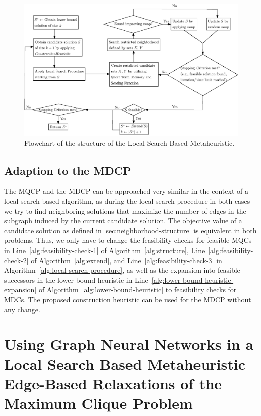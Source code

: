 \documentclass[draft,final]{vutinfth} %
\begin{document}
\begin{figure}
    \centering
    \includegraphics[width=\textwidth]{graphics/flowchart_local_search_algorithm.eps}
    \caption{Flowchart of the structure of the Local Search Based Metaheuristic.}
    \label{fig:flowchart-local-search-algorithm}
\end{figure}
 
\section{Adaption to the MDCP}\label{sec:adaption-to-mdcp}
The MQCP and the MDCP can be approached very similar in the context of a local search based algorithm, as during the local search procedure in both cases we try to find neighboring solutions that maximize the number of edges in the subgraph induced by the current candidate solution. The objective value of a candidate solution as defined in \ref{sec:neighborhood-structure} is equivalent in both problems. Thus, we only have to change the feasibility checks for feasible MQCs in Line~\ref{alg:feasibility-check-1} of Algorithm~\ref{alg:structure}, Line~\ref{alg:feasibility-check-2} of Algorithm~\ref{alg:extend}, and Line~\ref{alg:feasibility-check-3} in Algorithm~\ref{alg:local-search-procedure}, as well as the expansion into feasible successors in the lower bound heuristic in Line~\ref{alg:lower-bound-heuristic-expansion} of Algorithm~\ref{alg:lower-bound-heuristic} to feasibility checks for MDCs. The proposed construction heuristic can be used for the MDCP without any change.  

\chapter{Using Graph Neural Networks in a Local Search Based Metaheuristic Edge-Based Relaxations of the Maximum Clique Problem}\label{chp:gnn}
\end{document}
